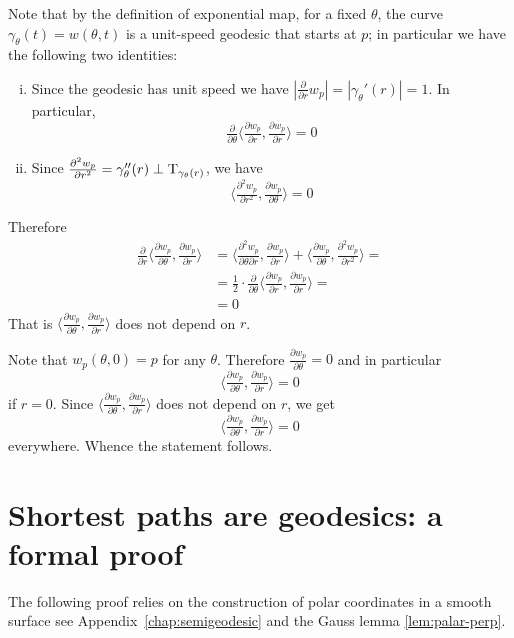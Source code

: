 Note that by the definition of exponential map, for a fixed $\theta$, the curve $\gamma_\theta(t)=w(\theta,t)$ is a unit-speed geodesic that starts at $p$;
in particular we have the following two identities:
\begin{enumerate}[(i)]
\item Since the geodesic has unit speed we have $|\tfrac{\partial}{\partial r}w_p|=|\gamma_\theta'(r)|=1$. In particular,
 \[\tfrac{\partial}{\partial \theta}\langle\tfrac{\partial w_p}{\partial r},\tfrac{\partial w_p}{\partial r}\rangle=0\]
\item Since $\tfrac{\partial^2w_p}{\partial r^2}=\gamma''_\theta(r)\perp\mathrm{T}_{\gamma_\theta(r)}$, we have 
\[\langle\tfrac{\partial^2w_p}{\partial r^2},\tfrac{\partial w_p}{\partial \theta}\rangle=0\]
\end{enumerate}
Therefore
\begin{align*}
\tfrac{\partial}{\partial r}
\langle\tfrac{\partial w_p}{\partial\theta},\tfrac{\partial w_p}{\partial r}\rangle
&=\langle\tfrac{\partial^2 w_p}{\partial\theta\partial r},\tfrac{\partial w_p}{\partial r}\rangle
+
\langle\tfrac{\partial w_p}{\partial\theta},\tfrac{\partial^2 w_p}{\partial r^2}\rangle=
\\
&=\tfrac12\cdot \tfrac{\partial}{\partial \theta}\langle\tfrac{\partial w_p}{\partial r},\tfrac{\partial w_p}{\partial r}\rangle=
\\
&=0
\end{align*}
That is $\langle\tfrac{\partial w_p}{\partial\theta},\tfrac{\partial w_p}{\partial r}\rangle$ does not depend on $r$.

Note that $w_p(\theta,0)=p$ for any $\theta$.
Therefore
$\tfrac{\partial w_p}{\partial\theta}=0$
and in particular 
\[\langle\tfrac{\partial w_p}{\partial\theta},\tfrac{\partial w_p}{\partial r}\rangle=0\]
if $r=0$.
Since $\langle\tfrac{\partial w_p}{\partial\theta},\tfrac{\partial w_p}{\partial r}\rangle$ does not depend on $r$, 
we get 
\[\langle\tfrac{\partial w_p}{\partial\theta},\tfrac{\partial w_p}{\partial r}\rangle=0\]
everywhere.
Whence the statement follows.
\qeds

\section*{Shortest paths are geodesics: a formal proof}

The following proof relies on the construction of polar coordinates in a smooth surface see Appendix~\ref{chap:semigeodesic} and the Gauss lemma \ref{lem:palar-perp}.

